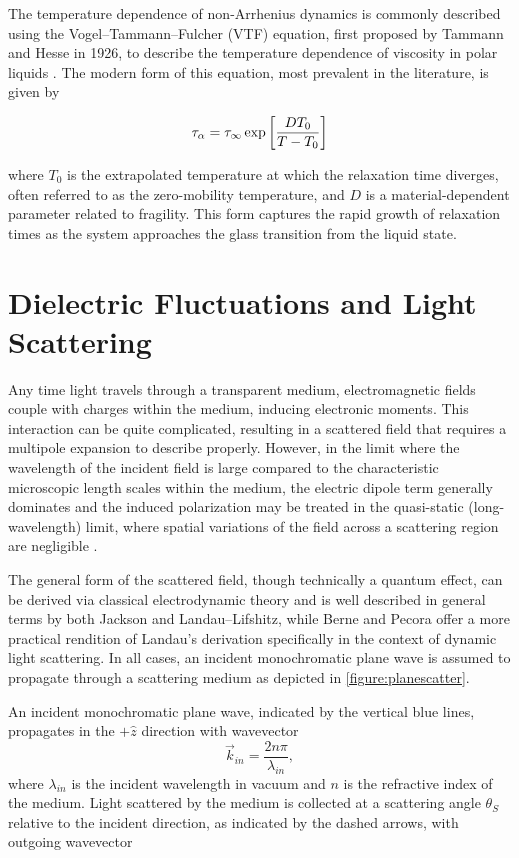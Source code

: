 The temperature dependence of non-Arrhenius dynamics is commonly described using the Vogel--Tammann--Fulcher (VTF) equation, first proposed by Tammann and Hesse in 1926, to describe the temperature dependence of viscosity in polar liquids \cite{Tammann}.  The modern form of this equation, most prevalent in the literature, is given by

\begin{equation}
	\centering
	\tau_\alpha=\tau_\infty  \exp\left [ \frac{DT_0}{T-T_0} \right ]
	\label{eqn:VTFintro}
\end{equation}

\noindent where $T_0$ is the extrapolated temperature at which the relaxation time diverges, often referred to as the zero-mobility temperature, and $D$ is a material-dependent parameter related to fragility. This form captures the rapid growth of relaxation times as the system approaches the glass transition from the liquid state.

\section{Dielectric Fluctuations and Light Scattering}
\label{sec:TheScatteredField}

Any time light travels through a transparent medium, electromagnetic fields couple with charges within the medium, inducing electronic moments. This interaction can be quite complicated, resulting in a scattered field that requires a multipole expansion to describe properly. However, in the limit where the wavelength of the incident field is large compared to the characteristic microscopic length scales within the medium, the electric dipole term generally dominates and the induced polarization may be treated in the quasi-static (long-wavelength) limit, where spatial variations of the field across a scattering region are negligible \cite[p.~572]{Jackson}. 

The general form of the scattered field, though technically a quantum effect, can be derived via classical electrodynamic theory and is well described in general terms by both Jackson and Landau–Lifshitz, while Berne and Pecora offer a more practical rendition of Landau’s derivation specifically in the context of dynamic light scattering\nolinebreak \cite{Landau,Jackson,Berne}. In all cases, an incident monochromatic plane wave is assumed to propagate through a scattering medium as depicted in \fig \nolinebreak \ref{figure:planescatter}.

An incident monochromatic plane wave, indicated by the vertical blue lines, propagates in the $+\hat{z}$ direction with wavevector
\begin{equation}
\vec{k}_{in} = \frac{2 n \pi}{\lambda_{in}},
\end{equation}
where $\lambda_{in}$ is the incident wavelength in vacuum and $n$ is the refractive index of the medium. Light scattered by the medium is collected at a scattering angle $\theta_S$ relative to the incident direction, as indicated by the dashed arrows, with outgoing wavevector

